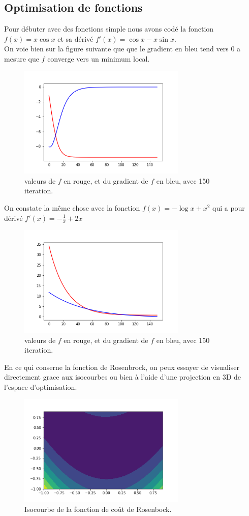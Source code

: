 \documentclass{article}
\begin{document}
\subsection{Optimisation de fonctions}
Pour débuter avec des fonctions simple nous avons codé la fonction $f(x) = x\cos x$ et sa dérivé $f'(x) = \cos x - x\sin x$.\\
On voie bien sur la figure suivante que que le gradient en bleu tend vers 0 a mesure que $f$ converge vers un minimum local.\\
\begin{figure}[h]
	\center
	\includegraphics[width=8cm]{figure/tme3/xcox.png} 
	 \caption{valeurs de $f$ en rouge, et du gradient de $f$ en bleu, avec 150 iteration.}
	 
\end{figure}
On constate la même chose avec la fonction $f(x) = -\log x + x^2$ qui a pour dérivé $f'(x) = -\frac{1}{x}+2x $
\begin{figure}[h]
	\center
	\includegraphics[width=8cm]{figure/tme3/logx.png} 
	 \caption{valeurs de $f$ en rouge, et du gradient de $f$ en bleu, avec 150 iteration.}
	 
\end{figure}
En ce qui conserne la fonction de Rosenbrock, on peux essayer de visualiser directement grace aux isocourbes ou bien à l'aide d'une projection en 3D de l'espace d'optimisation.\\
\begin{figure}[h]
	\center
	\includegraphics[width=8cm]{figure/tme3/rosenBrock2D.png} 
	 \caption{Isocourbe de la fonction de coût de Rosenbock.}
	 
\end{figure}
\end{document}
